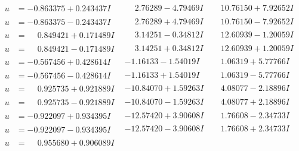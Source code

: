 \documentclass[1p]{elsarticle_modified}
\theoremstyle{definition}
\begin{document}
$$\begin{array}{c|c|c}
\begin{aligned}
u &= -0.863375 + 0.243437 I\end{aligned}
 & \phantom{-}2.76289 - 4.79469 I & \phantom{-}10.76150 + 7.92652 I \\ \hline\begin{aligned}
u &= -0.863375 - 0.243437 I\end{aligned}
 & \phantom{-}2.76289 + 4.79469 I & \phantom{-}10.76150 - 7.92652 I \\ \hline\begin{aligned}
u &= \phantom{-}0.849421 + 0.171489 I\end{aligned}
 & \phantom{-}3.14251 - 0.34812 I & \phantom{-}12.60939 - 1.20059 I \\ \hline\begin{aligned}
u &= \phantom{-}0.849421 - 0.171489 I\end{aligned}
 & \phantom{-}3.14251 + 0.34812 I & \phantom{-}12.60939 + 1.20059 I \\ \hline\begin{aligned}
u &= -0.567456 + 0.428614 I\end{aligned}
 & -1.16133 - 1.54019 I & \phantom{-}1.06319 + 5.77766 I \\ \hline\begin{aligned}
u &= -0.567456 - 0.428614 I\end{aligned}
 & -1.16133 + 1.54019 I & \phantom{-}1.06319 - 5.77766 I \\ \hline\begin{aligned}
u &= \phantom{-}0.925735 + 0.921889 I\end{aligned}
 & -10.84070 + 1.59263 I & \phantom{-}4.08077 - 2.18896 I \\ \hline\begin{aligned}
u &= \phantom{-}0.925735 - 0.921889 I\end{aligned}
 & -10.84070 - 1.59263 I & \phantom{-}4.08077 + 2.18896 I \\ \hline\begin{aligned}
u &= -0.922097 + 0.934395 I\end{aligned}
 & -12.57420 + 3.90608 I & \phantom{-}1.76608 - 2.34733 I \\ \hline\begin{aligned}
u &= -0.922097 - 0.934395 I\end{aligned}
 & -12.57420 - 3.90608 I & \phantom{-}1.76608 + 2.34733 I \\ \hline\begin{aligned}
u &= \phantom{-}0.955680 + 0.906089 I\end{aligned}

\end{array}$$
\end{document}

